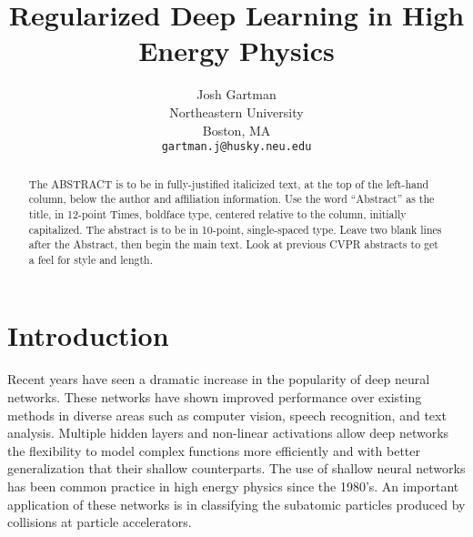 \documentclass[12pt,letterpaper]{article}
\begin{document}
\title{Regularized Deep Learning in High Energy Physics}

\author{Josh Gartman\\
Northeastern University\\
Boston, MA\\
{\tt\small gartman.j@husky.neu.edu}
}

\maketitle

\begin{abstract}
   The ABSTRACT is to be in fully-justified italicized text, at the top
   of the left-hand column, below the author and affiliation
   information. Use the word ``Abstract'' as the title, in 12-point
   Times, boldface type, centered relative to the column, initially
   capitalized. The abstract is to be in 10-point, single-spaced type.
   Leave two blank lines after the Abstract, then begin the main text.
   Look at previous CVPR abstracts to get a feel for style and length.
\end{abstract}

\section{Introduction}
Recent years have seen a dramatic increase in the popularity of deep neural networks.  These networks have shown improved performance over existing methods in diverse areas such as computer vision, speech recognition, and text analysis.  Multiple hidden layers and non-linear activations allow deep networks the flexibility to model complex functions more efficiently and with better generalization that their shallow counterparts.  The use of shallow neural networks has been common practice in high energy physics since the 1980's.  An important application of these networks is in classifying the subatomic particles produced by collisions at particle accelerators.
\end{document}
